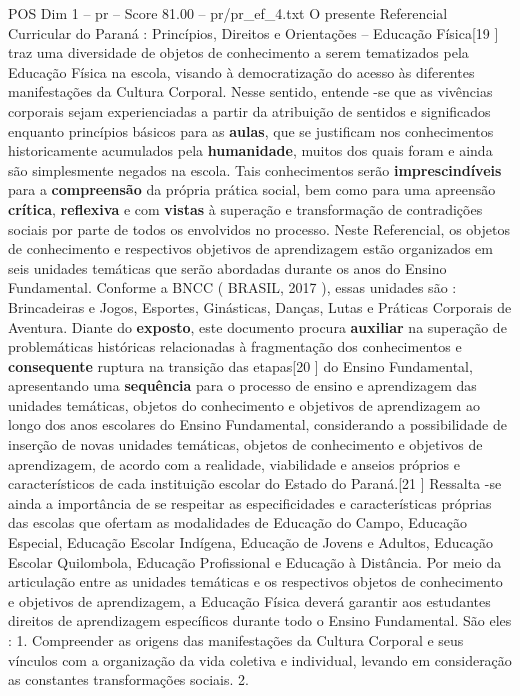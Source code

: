 \begin{textsample}{POS Dim 1 – pr – Score 81.00 – pr/pr\_ef\_4.txt}
O presente Referencial Curricular do Paraná : Princípios, Direitos e Orientações – Educação Física[19 ] traz uma diversidade de objetos de conhecimento a serem tematizados pela Educação Física na escola, visando à democratização do acesso às diferentes manifestações da Cultura Corporal.
Nesse sentido, entende -se que as vivências corporais sejam experienciadas a partir da atribuição de sentidos e significados enquanto princípios básicos para as \textbf{aulas}, que se justificam nos conhecimentos historicamente acumulados pela \textbf{humanidade}, muitos dos quais foram e ainda são simplesmente negados na escola.
Tais conhecimentos serão \textbf{imprescindíveis} para a \textbf{compreensão} da própria prática social, bem como para uma apreensão \textbf{crítica}, \textbf{reflexiva} e com \textbf{vistas} à superação e transformação de contradições sociais por parte de todos os envolvidos no processo.
Neste Referencial, os objetos de conhecimento e respectivos objetivos de aprendizagem estão organizados em seis unidades temáticas que serão abordadas durante os anos do Ensino Fundamental.
Conforme a BNCC ( BRASIL, 2017 ), essas unidades são : Brincadeiras e Jogos, Esportes, Ginásticas, Danças, Lutas e Práticas Corporais de Aventura.
Diante do \textbf{exposto}, este documento procura \textbf{auxiliar} na superação de problemáticas históricas relacionadas à fragmentação dos conhecimentos e \textbf{consequente} ruptura na transição das etapas[20 ] do Ensino Fundamental, apresentando uma \textbf{sequência} para o processo de ensino e aprendizagem das unidades temáticas, objetos do conhecimento e objetivos de aprendizagem ao longo dos anos escolares do Ensino Fundamental, considerando a possibilidade de inserção de novas unidades temáticas, objetos de conhecimento e objetivos de aprendizagem, de acordo com a realidade, viabilidade e anseios próprios e característicos de cada instituição escolar do Estado do Paraná.[21 ] Ressalta -se ainda a importância de se respeitar as especificidades e características próprias das escolas que ofertam as modalidades de Educação do Campo, Educação Especial, Educação Escolar Indígena, Educação de Jovens e Adultos, Educação Escolar Quilombola, Educação Profissional e Educação à Distância.
Por meio da articulação entre as unidades temáticas e os respectivos objetos de conhecimento e objetivos de aprendizagem, a Educação Física deverá garantir aos estudantes direitos de aprendizagem específicos durante todo o Ensino Fundamental.
São eles : 1.
Compreender as origens das manifestações da Cultura Corporal e seus vínculos com a organização da vida coletiva e individual, levando em consideração as constantes transformações sociais. 2.

\end{textsample}
